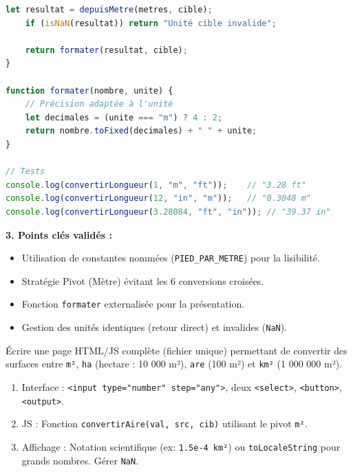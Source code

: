 \documentclass[11pt]{article}
\begin{document}
\begin{exoresolu}
\begin{lstlisting}[language=JavaScript]
    let resultat = depuisMetre(metres, cible);
    if (isNaN(resultat)) return "Unité cible invalide";
    
    return formater(resultat, cible);
}

function formater(nombre, unite) {
    // Précision adaptée à l'unité
    let decimales = (unite === "m") ? 4 : 2;
    return nombre.toFixed(decimales) + " " + unite;
}

// Tests
console.log(convertirLongueur(1, "m", "ft"));    // "3.28 ft"
console.log(convertirLongueur(12, "in", "m"));   // "0.3048 m"
console.log(convertirLongueur(3.28084, "ft", "in")); // "39.37 in"
\end{lstlisting}

\textbf{3. Points clés validés :}
\begin{itemize}
    \item Utilisation de constantes nommées (\texttt{PIED\_PAR\_METRE}) pour la lisibilité.
    \item Stratégie Pivot (Mètre) évitant les 6 conversions croisées.
    \item Fonction \texttt{formater} externalisée pour la présentation.
    \item Gestion des unités identiques (retour direct) et invalides (\texttt{NaN}).
\end{itemize}
\end{exoresolu}

\begin{exercice}
Écrire une page HTML/JS complète (fichier unique) permettant de convertir des surfaces entre \texttt{m²}, \texttt{ha} (hectare : 10 000 m²), \texttt{are} (100 m²) et \texttt{km²} (1 000 000 m²).
\begin{enumerate}
    \item Interface : \texttt{<input type="number" step="any">}, deux \texttt{<select>}, \texttt{<button>}, \texttt{<output>}.
    \item JS : Fonction \texttt{convertirAire(val, src, cib)} utilisant le pivot \texttt{m²}.
    \item Affichage : Notation scientifique (ex: \texttt{1.5e-4 km²}) ou \texttt{toLocaleString} pour grands nombres. Gérer \texttt{NaN}.
\end{enumerate}
\end{exercice}
\end{document}

